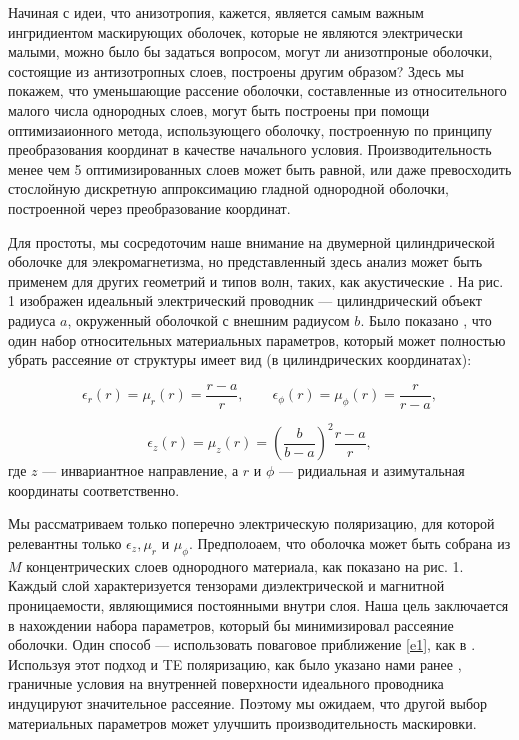 \documentclass[a4paper, 12pt]{article}
\begin{document}
Начиная с идеи, что анизотропия, кажется, является самым важным ингридиентом
маскирующих оболочек, которые не являются электрически малыми, можно было бы
задаться вопросом, могут ли анизотпроные оболочки, состоящие из антизотропных 
слоев, построены другим образом? Здесь мы покажем, что уменьшающие рассение
оболочки, составленные из относительного малого числа однородных слоев,
могут быть построены при помощи оптимизаионного метода, использующего 
оболочку, построенную по принципу преобразования координат в качестве начального 
условия.
Производительность менее чем 5 оптимизированных слоев может быть равной,
или даже превосходить стослойную дискретную аппроксимацию гладной однородной
оболочки, построенной через преобразование координат.

Для простоты, мы сосредоточим наше внимание на двумерной цилиндрической оболочке
для элекромагнетизма, но представленный здесь анализ может быть применем для
других геометрий и типов волн, таких, как акустические \cite{8}. На рис. 1
изображен идеальный электрический проводник --- цилиндрический объект радиуса
$a$, окруженный оболочкой с внешним радиусом $b$. Было показано \cite{2},
что один набор относительных материальных параметров, который может полностью
убрать рассеяние от структуры имеет вид (в цилиндрических координатах):

\begin{equation*}
	\epsilon_r(r) = \mu_r(r) = \frac{r-a}{r}, \qquad 
	\epsilon_\phi(r) = \mu_\phi(r) = \frac{r}{r-a},
\end{equation*}

\begin{equation}\label{e1}
	\epsilon_z(r) = \mu_z(r) = \left( \frac{b}{b-a}	\right)^2 \frac{r-a}{r},
\end{equation}
где $z$ --- инвариантное направление, а $r$ и $\phi$ --- ридиальная и азимутальная
координаты соответственно.

Мы рассматриваем только поперечно электрическую поляризацию, для которой
релевантны только $\epsilon_z, \mu_r$ и $\mu_\phi$. Предполоаем, что оболочка
может быть собрана из $M$ концентрических слоев однородного материала, как показано
на рис. 1. Каждый слой характеризуется тензорами диэлектрической и магнитной
проницаемости, являющимися постоянными внутри слоя. Наша цель заключается в 
нахождении набора параметров, который бы минимизировал рассеяние оболочки.
Один способ --- использовать поваговое приближение \eqref{e1}, как в \cite{4}.
Используя этот подход и TE поляризацию, как было указано нами ранее \cite{9,10},
граничные условия на внутренней поверхности идеального проводника индуцируют
значительное рассеяние. Поэтому мы ожидаем, что другой выбор материальных 
параметров может улучшить производительность маскировки.
\end{document}
